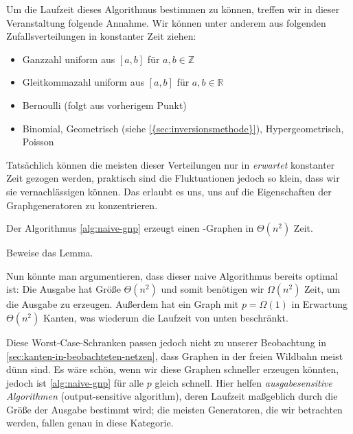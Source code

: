 Um  die Laufzeit dieses Algorithmus bestimmen zu können, treffen wir in dieser Veranstaltung folgende Annahme.
Wir können unter anderem aus folgenden Zufallsverteilungen in konstanter Zeit ziehen:
\begin{itemize}
    \item Ganzzahl uniform aus $[a, b]$ für $a, b \in \mathbb{Z}$
    \item Gleitkommazahl uniform aus $[a, b]$ für $a, b \in \mathbb{R}$
    \item Bernoulli (folgt aus vorherigem Punkt)
    \item Binomial, Geometrisch (siehe \cref{{sec:inversionsmethode}}), Hypergeometrisch, Poisson
\end{itemize}

Tatsächlich können die meisten dieser Verteilungen nur in \emph{erwartet} konstanter Zeit gezogen werden, praktisch sind die Fluktuationen jedoch so klein, dass wir sie vernachlässigen können.
Das erlaubt es uns, uns auf die Eigenschaften der Graphgeneratoren zu konzentrieren.

\begin{lemma}
    \label{lem:naive-gnp}
    Der Algorithmus \ref{alg:naive-gnp} erzeugt einen \Gnp-Graphen in $\Theta(n^2)$ Zeit.
\end{lemma}

\begin{exercise}
    Beweise das Lemma.
\end{exercise}

Nun könnte man argumentieren, dass dieser naive Algorithmus bereits optimal ist:
Die Ausgabe hat Größe $\Theta(n^2)$ und somit benötigen wir $\Omega(n^2)$ Zeit, um die Ausgabe zu erzeugen.
Außerdem hat ein Graph mit $p=\Omega(1)$ in Erwartung $\Theta(n^2)$ Kanten, was wiederum die Laufzeit von unten beschränkt.

Diese Worst-Case-Schranken passen jedoch nicht zu unserer Beobachtung in \cref{sec:kanten-in-beobachteten-netzen}, dass Graphen in der freien Wildbahn meist dünn sind.
Es wäre schön, wenn wir diese Graphen schneller erzeugen könnten, jedoch ist \cref{alg:naive-gnp} für alle $p$ gleich \glqq schnell\grqq.
Hier  helfen \emph{ausgabesensitive Algorithmen} (output-sensitive algorithm), deren Laufzeit maßgeblich durch die Größe der Ausgabe bestimmt wird;
die meisten Generatoren, die wir betrachten werden, fallen genau in diese Kategorie.

